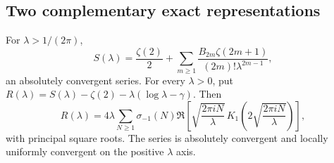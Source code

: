 \subsection{Two complementary exact representations}

\begin{theorem}
\label{herg:thm:dual}
For $\lambda>1/(2\pi)$,
\begin{equation}\label{herg:eq:zetaprofile}
 S(\lambda)=\frac{\zeta(2)}2+
       \sum_{m\geq1}\frac{B_{2m}\zeta(2m+1)}{(2m)!\lambda^{2m-1}},
\end{equation}
an absolutely convergent series. For every $\lambda>0$, put
$R(\lambda)=S(\lambda)-\zeta(2)-\lambda(\log\lambda-\gamma)$.
Then
\begin{equation}\label{herg:eq:Besselprofile}
 R(\lambda)=4\lambda\sum_{N\geq1}\sigma_{-1}(N)
 \Re\left[
  \sqrt{\frac{2\pi iN}{\lambda}}\,
  K_1\left(2\sqrt{\frac{2\pi iN}{\lambda}}\right)\right],
\end{equation}
with principal square roots. The series is absolutely convergent and
locally uniformly convergent on the positive $\lambda$ axis.
\end{theorem}
